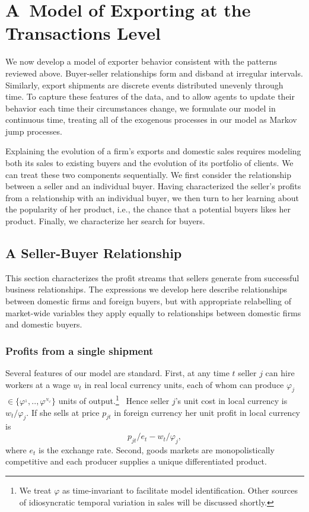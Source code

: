 \section{A\ Model of Exporting at the Transactions Level}

We now develop a model of exporter behavior consistent with the patterns
reviewed above. Buyer-seller relationships form and disband at irregular
intervals. Similarly, export shipments are discrete events distributed
unevenly through time. To capture these features of the data, and to allow
agents to update their behavior each time their circumstances change, we
formulate our model in continuous time, treating all of the exogenous
processes in our model as Markov jump processes.

Explaining the evolution of a firm's exports and domestic sales requires
modeling both its sales to existing buyers and the evolution of its
portfolio of clients. We can treat these two components sequentially. We
first consider the relationship between a seller and an individual buyer.
Having characterized the seller's profits from a relationship with an
individual buyer, we then turn to her learning about the popularity of her
product, i.e., the chance that a potential buyers likes her product.
Finally, we characterize her search for buyers.





\subsection{A Seller-Buyer Relationship}

This section characterizes the profit streams that sellers generate from
successful business relationships. The expressions we develop here describe
relationships between domestic firms and foreign buyers, but with
appropriate relabelling of market-wide variables they apply equally to
relationships between domestic firms and domestic buyers.

\subsubsection{Profits from a single shipment}

Several features of our model are standard. First, at any time $t$ seller $j$
can hire workers at a wage $w_{t}$ in real local currency units, each of
whom can produce $\varphi _{j}$ $\in \{\varphi ^{_{1}},..,\varphi
^{_{N_{\varphi }}}\}$ units of output.\footnote{%
We treat $\varphi $ as time-invariant to facilitate model identification.
Other sources of idiosyncratic temporal variation in sales will be discussed
shortly.\medskip} \ Hence seller $j$'s unit cost in local currency is $%
w_{t}/\varphi _{j}.$ If she sells at price $p_{jt}$ in foreign currency her
unit profit in local currency is%
\begin{equation}
p_{jt}/e_{t}-w_{t}/\varphi _{j},  \label{unit profit}
\end{equation}%
where $e_{t}$ is the exchange rate. Second, goods markets are
monopolistically competitive and each producer supplies a unique
differentiated product.

